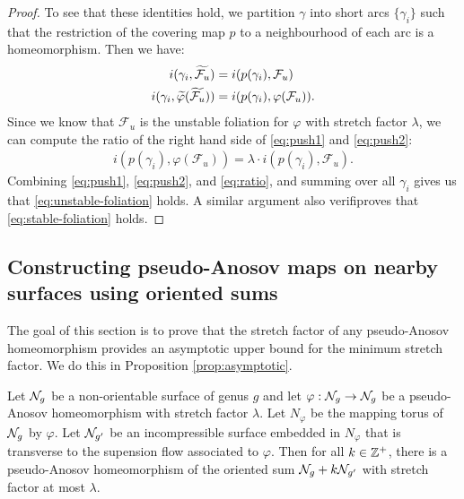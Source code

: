 \begin{proof}
  To see that these identities hold, we partition $\gamma$ into short arcs $\{\gamma_i\}$ such that the restriction of the covering map $p$ to a neighbourhood of each arc is a homeomorphism.
  Then we have:
  \begin{align}
  \label{eq:push1}
    i(\gamma_i, \widetilde{\mathcal{F}_u}) &= i(p(\gamma_i), \mathcal{F}_u) \\
  \label{eq:push2}
    i(\gamma_i, \widetilde{\varphi}(\widetilde{\mathcal{F}_u})) &= i(p(\gamma_i), \varphi(\mathcal{F}_u)).
  \end{align}
  Since we know that $\mathcal{F}_u$ is the unstable foliation for $\varphi$ with stretch factor $\lambda$, we can compute the ratio of the right hand side of \eqref{eq:push1} and \eqref{eq:push2}:
  \begin{align}
      \label{eq:ratio}
      i(p(\gamma_i), \varphi(\mathcal{F}_u)) = \lambda \cdot i(p(\gamma_i), \mathcal{F}_u).
  \end{align}
  Combining \eqref{eq:push1}, \eqref{eq:push2}, and \eqref{eq:ratio}, and summing over all $\gamma_i$ gives us that \eqref{eq:unstable-foliation} holds. A similar argument also verifiproves that \eqref{eq:stable-foliation} holds.
\end{proof}



\subsection{Constructing pseudo-Anosov maps on nearby surfaces using oriented sums}
\label{sec:constr-psuedo-anos}
The goal of this section is to prove that the stretch factor of any pseudo-Anosov homeomorphism provides an asymptotic upper bound for the minimum stretch factor.  We do this in Proposition \ref{prop:asymptotic}.


\begin{prop}\label{prop:asymptotic}
Let $\mathcal{N}_g$ be a non-orientable surface of genus $g$ and let $\varphi:\mathcal{N}_g\rightarrow \mathcal{N}_g$ be a pseudo-Anosov homeomorphism with stretch factor $\lambda$.  Let $N_\varphi$ be the mapping torus of $\mathcal{N}_g$ by $\varphi$.  Let $\mathcal{N}_{g'}$ be an incompressible surface embedded in $N_\varphi$ that is transverse to the supension flow associated to $\varphi$.  Then for all $k\in\mathbb{Z}^+$, there is a pseudo-Anosov homeomorphism of the oriented sum $\mathcal{N}_{g}+k\mathcal{N}_{g'}$ with stretch factor at most $\lambda$.
\end{prop}

